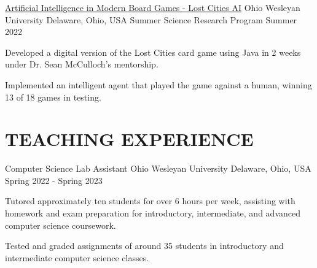 \documentclass[10pt, letterpaper]{article}
\begin{document}
\begin{researchentry}
  {\href{https://github.com/agopalareddy/LostCities}{Artificial Intelligence in Modern Board Games - Lost Cities AI}} %
  {Ohio Wesleyan University} %
  {Delaware, Ohio, USA} %
  {Summer Science Research Program} %
  {Summer 2022} %
  \item Developed a digital version of the Lost Cities card game using Java in 2 weeks under Dr. Sean McCulloch's mentorship.
  \item Implemented an intelligent agent that played the game against a human, winning 13 of 18 games in testing.
\end{researchentry}

\vspace{\headerSpacing}

\section{TEACHING EXPERIENCE}

\begin{experienceentry}
  {Computer Science Lab Assistant} %
  {Ohio Wesleyan University} %
  {Delaware, Ohio, USA} %
  {Spring 2022 - Spring 2023} %
  \item Tutored approximately ten students for over 6 hours per week, assisting with homework and exam preparation for introductory, intermediate, and advanced computer science coursework.
  \item Tested and graded assignments of around 35 students in introductory and intermediate computer science classes.
\end{experienceentry}

\vspace{\headerSpacing}

\end{document}
